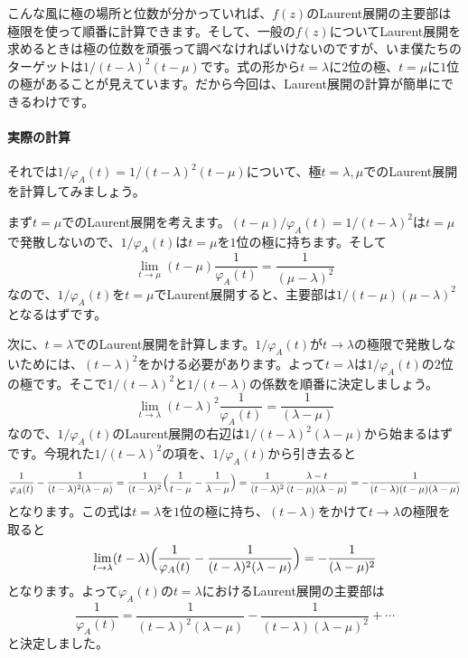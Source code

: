 こんな風に極の場所と位数が分かっていれば、$f(z)$のLaurent展開の主要部は極限を使って順番に計算できます。そして、一般の$f(z)$についてLaurent展開を求めるときは極の位数を頑張って調べなければいけないのですが、いま僕たちのターゲットは$1/(t - \lambda)^2 (t - \mu)$です。式の形から$t = \lambda$に$2$位の極、$t = \mu$に$1$位の極があることが見えています。だから今回は、Laurent展開の計算が簡単にできるわけです。

\paragraph{実際の計算}

それでは$1/\varphi_A(t) = 1/(t - \lambda)^2 (t - \mu)$について、極$t = \lambda, \mu$でのLaurent展開を計算してみましょう。

まず$t = \mu$でのLaurent展開を考えます。$(t - \mu)/\varphi_A(t) = 1/(t - \lambda)^2$は$t = \mu$で発散しないので、$1/\varphi_A(t)$は$t = \mu$を$1$位の極に持ちます。そして
\[
\lim_{t \rightarrow \mu} (t - \mu)\frac{1}{\varphi_A(t)} = \frac{1}{(\mu - \lambda)^2}
\]
なので、$1/\varphi_A(t)$を$t = \mu$でLaurent展開すると、主要部は$1/(t - \mu)(\mu - \lambda)^2$となるはずです。

次に、$t = \lambda$でのLaurent展開を計算します。$1/\varphi_A(t)$が$t \rightarrow \lambda$の極限で発散しないためには、$(t - \lambda)^2$をかける必要があります。よって$t = \lambda$は$1/\varphi_A(t)$の$2$位の極です。そこで$1/(t - \lambda)^2$と$1/(t - \lambda)$の係数を順番に決定しましょう。
\[
\lim_{t \rightarrow \lambda} (t - \lambda)^2 \frac{1}{\varphi_A(t)} = \frac{1}{(\lambda - \mu)}
\]
なので、$1/\varphi_A(t)$のLaurent展開の右辺は$1/(t - \lambda)^2(\lambda - \mu)$から始まるはずです。今現れた$1/(t - \lambda)^2$の項を、$1/\varphi_A(t)$から引き去ると
\[
\frac{1}{\varphi_A(t)} - \frac{1}{(t - \lambda)^2 (\lambda - \mu)}
= \frac{1}{(t - \lambda)^2} \Bigl(\frac{1}{t - \mu} - \frac{1}{\lambda - \mu}\Bigr)
= \frac{1}{(t - \lambda)^2}\frac{\lambda - t}{(t - \mu)(\lambda - \mu)}
= -\frac{1}{(t - \lambda)(t - \mu)(\lambda - \mu)}
\]
となります。この式は$t = \lambda$を$1$位の極に持ち、$(t - \lambda)$をかけて$t \rightarrow \lambda$の極限を取ると
\[
\lim_{t \rightarrow \lambda} (t - \lambda) \Bigl( \frac{1}{\varphi_A(t)} - \frac{1}{(t - \lambda)^2 (\lambda - \mu)} \Bigr)
= -\frac{1}{(\lambda - \mu)^2}
\]
となります。よって$\varphi_A(t)$の$t = \lambda$におけるLaurent展開の主要部は
\[
\frac{1}{\varphi_A(t)}
= \frac{1}{(t - \lambda)^2(\lambda - \mu)} - \frac{1}{(t - \lambda)(\lambda - \mu)^2} + \cdots
\]
と決定しました。

